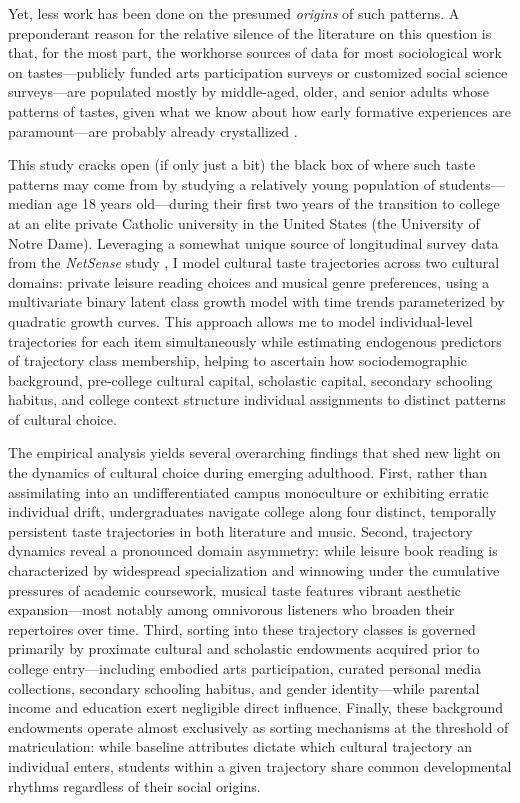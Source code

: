 \documentclass[12pt]{article}
\begin{document}
Yet, less work has been done on the presumed \textit{origins} of such patterns. A preponderant reason for the relative silence of the literature on this question is that, for the most part, the workhorse sources of data for most sociological work on tastes---publicly funded arts participation surveys or customized social science surveys---are populated mostly by middle-aged, older, and senior adults whose patterns of tastes, given what we know about how early formative experiences are paramount---are probably already crystallized \citep{kiley2020measuring-123, keskintürk2025what-483}. 

This study cracks open (if only just a bit) the black box of where such taste patterns may come from by studying a relatively young population of students---median age 18 years old---during their first two years of the transition to college at an elite private Catholic university in the United States (the University of Notre Dame). Leveraging a somewhat unique source of longitudinal survey data from the \textit{NetSense} study \citep{striegel2013lessons}, I model cultural taste trajectories across two cultural domains: private leisure reading choices and musical genre preferences, using a multivariate binary latent class growth model with time trends parameterized by quadratic growth curves. This approach allows me to model individual-level trajectories for each item simultaneously while estimating endogenous predictors of trajectory class membership, helping to ascertain how sociodemographic background, pre-college cultural capital, scholastic capital, secondary schooling habitus, and college context structure individual assignments to distinct patterns of cultural choice.

The empirical analysis yields several overarching findings that shed new light on the dynamics of cultural choice during emerging adulthood. First, rather than assimilating into an undifferentiated campus monoculture or exhibiting erratic individual drift, undergraduates navigate college along four distinct, temporally persistent taste trajectories in both literature and music. Second, trajectory dynamics reveal a pronounced domain asymmetry: while leisure book reading is characterized by widespread specialization and winnowing under the cumulative pressures of academic coursework, musical taste features vibrant aesthetic expansion---most notably among omnivorous listeners who broaden their repertoires over time. Third, sorting into these trajectory classes is governed primarily by proximate cultural and scholastic endowments acquired prior to college entry---including embodied arts participation, curated personal media collections, secondary schooling habitus, and gender identity---while parental income and education exert negligible direct influence. Finally, these background endowments operate almost exclusively as sorting mechanisms at the threshold of matriculation: while baseline attributes dictate which cultural trajectory an individual enters, students within a given trajectory share common developmental rhythms regardless of their social origins.
\end{document}
